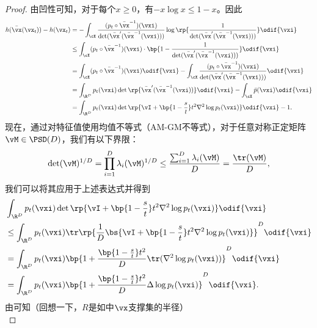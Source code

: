 \documentclass[../../book-main_zh.tex]{subfiles}
\begin{document}
\begin{proof}
    由凹性可知，对于每个\(x \geq 0\)，有\(-x\log x \leq 1 - x\)。因此
    \begin{align}
        h(\bar{\vx}(\vx_{t})) - h(\vx_{t})
        &= - \int_{\cX}\frac{(p_{t} \circ
        \bar{\vx}^{-1})(\vxi)}{\det(\bar{\vx}^{\prime}(\bar{\vx}^{-1}(\vxi)))}\log\rp{\frac{1}{\det(\bar{\vx}^{\prime}(\bar{\vx}^{-1}(\vxi)))}}\odif{\vxi}
        \\
        &\leq  \int_{\cX}(p_{t} \circ \bar{\vx}^{-1})(\vxi)\cdot
        \bp{1 -
        \frac{1}{\det(\bar{\vx}^{\prime}(\bar{\vx}^{-1}(\vxi)))}}\odif{\vxi} \\
        &= \int_{\cX}(p_{t} \circ \bar{\vx}^{-1})(\vxi)\odif{\vxi} -
        \int_{\cX}\frac{(p_{t} \circ
        \bar{\vx}^{-1})(\vxi)}{\det(\bar{\vx}^{\prime}(\bar{\vx}^{-1}(\vxi)))}\odif{\vxi}
        \\
        &=
        \int_{\R^{D}}p_{t}(\vxi)\det\rp{\bar{\vx}^{\prime}(\bar{\vx}^{-1}(\vxi))}\odif{\vxi}
        - \int_{\cX}\bar{p}(\vxi)\odif{\vxi} \\
        &= \int_{\R^{D}}p_{t}(\vxi)\det\rp{\vI + \bp{1 -
        \frac{s}{t}}t^{2}\nabla^{2}\log p_{t}(\vxi)}\odif{\vxi} - 1.
    \end{align}
    现在，通过对特征值使用均值不等式（AM-GM不等式），对于任意对称正定矩阵\(\vM \in \PSD(D)\)，我们有以下界限：
    \begin{equation}
        \det(\vM)^{1/D} = \prod_{i = 1}^{D}\lambda_{i}(\vM)^{1/D}
        \leq \frac{\sum_{i = 1}^{D}\lambda_{i}(\vM)}{D} = \frac{\tr(\vM)}{D},
    \end{equation}
    我们可以将其应用于上述表达式并得到
    \begin{align}
        &\int_{\R^{D}}p_{t}(\vxi)\det\rp{\vI + \bp{1 -
        \frac{s}{t}}t^{2}\nabla^{2}\log p_{t}(\vxi)}\odif{\vxi} \\
        &\leq \int_{\R^{D}} p_{t}(\vxi) \tr\rp{\frac{1}{D}\bs{\vI +
        \bp{1 - \frac{s}{t}}t^{2}\nabla^{2}\log p_{t}(\vxi)}}^{D}\odif{\vxi} \\
        &= \int_{\R^{D}} p_{t}(\vxi)\bp{1 + \frac{\bp{1 -
        \frac{s}{t}}t^{2}}{D}\tr(\nabla^{2}\log p_{t}(\vxi))}^{D}\odif{\vxi} \\
        &= \int_{\R^{D}} p_{t}(\vxi)\bp{1 + \frac{\bp{1 -
        \frac{s}{t}}t^{2}}{D}\Delta \log p_{t}(\vxi)}^{D}\odif{\vxi}.
    \end{align}
    由可知（回想一下，\(R\)是如中\(\vx\)支撑集的半径）
    \begin{equation}

\end{equation}
\end{proof}
\end{document}
